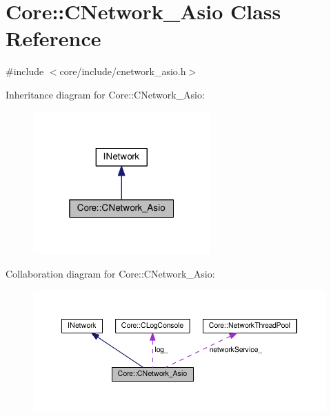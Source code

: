 \hypertarget{classCore_1_1CNetwork__Asio}{}\section{Core\+:\+:C\+Network\+\_\+\+Asio Class Reference}
\label{classCore_1_1CNetwork__Asio}


{\ttfamily \#include $<$core/include/cnetwork\+\_\+asio.\+h$>$}



Inheritance diagram for Core\+:\+:C\+Network\+\_\+\+Asio\+:\nopagebreak
\begin{figure}[H]
\begin{center}
\leavevmode
\includegraphics[width=193pt]{classCore_1_1CNetwork__Asio__inherit__graph}
\end{center}
\end{figure}


Collaboration diagram for Core\+:\+:C\+Network\+\_\+\+Asio\+:\nopagebreak
\begin{figure}[H]
\begin{center}
\leavevmode
\includegraphics[width=350pt]{classCore_1_1CNetwork__Asio__coll__graph}
\end{center}
\end{figure}
